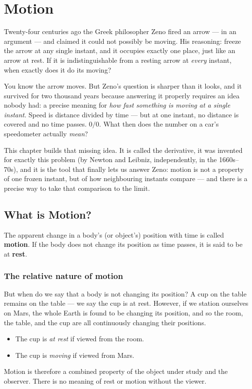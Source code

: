 \chapter{Motion}

Twenty-four centuries ago the Greek philosopher Zeno fired an arrow --- in an
argument --- and claimed it could not possibly be moving. His reasoning:
freeze the arrow at any single instant, and it occupies exactly one place,
just like an arrow at rest. If it is indistinguishable from a resting arrow
at \emph{every} instant, when exactly does it do its moving?

You know the arrow moves. But Zeno's question is sharper than it looks, and
it survived for two thousand years because answering it properly requires an
idea nobody had: a precise meaning for \emph{how fast something is moving at a
single instant}. Speed is distance divided by time --- but at one instant, no
distance is covered and no time passes. $0/0$. What then does the number on a
car's speedometer actually \emph{mean}?

This chapter builds that missing idea. It is called the derivative, it was
invented for exactly this problem (by Newton and Leibniz, independently, in
the 1660s--70s), and it is the tool that finally lets us answer Zeno: motion
is not a property of one frozen instant, but of how neighbouring instants
compare --- and there is a precise way to take that comparison to the limit.

\section{What is Motion?}

\begin{keybox}
The apparent change in a body's (or object's) position with time is called \textbf{motion}.
If the body does not change its position as time passes, it is said to be at \textbf{rest}.
\end{keybox}

\subsection{The relative nature of motion}

But when do we say that a body is not changing its position? A cup on the table remains on
the table --- we say the cup is at rest. However, if we station ourselves on Mars, the whole
Earth is found to be changing its position, and so the room, the table, and the cup are all
continuously changing their positions.
\begin{itemize}
  \item The cup is \emph{at rest} if viewed from the room.
  \item The cup is \emph{moving} if viewed from Mars.
\end{itemize}
Motion is therefore a combined property of the object under study and the observer. There
is no meaning of rest or motion without the viewer.


